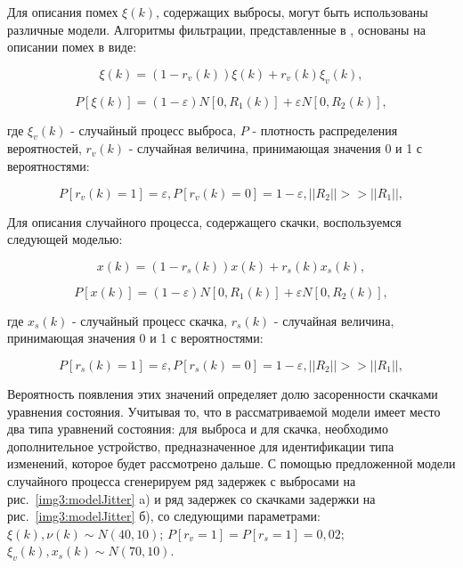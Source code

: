 Для описания помех $\xi(k)$, содержащих выбросы, могут быть использованы различные модели. Алгоритмы фильтрации, представленные в \cite{masreliez_ieee, masreliez_martin, ershov_lipcer, ershov}, основаны на описании помех в виде:


\begin{equation}\label{eq3:v}
\xi(k)=(1-r_v(k))\xi(k)+r_v(k)\xi_v(k),
\end{equation}

\begin{equation}\label{eq3:vp}
P[\xi(k)]=(1-\varepsilon)N[0,R_1(k)]+\varepsilon N[0,R_2(k)],
\end{equation}

\noindent где $\xi_v(k)$ - случайный процесс выброса, $P$ - плотность распределения вероятностей, $r_v(k)$ - случайная величина, принимающая значения 0 и 1 с вероятностями:

\begin{equation}\label{eq3:vpp}
P[r_v(k)=1]=\varepsilon, P[r_v(k)=0]=1-\varepsilon, ||R_2||>>||R_1||,
\end{equation}


Для описания случайного процесса, содержащего скачки, воспользуемся следующей моделью:

\begin{equation}\label{eq3:s}
x(k)=(1-r_s(k))x(k)+r_s(k)x_s(k),
\end{equation}

\begin{equation}\label{eq3:sp}
P[x(k)]=(1-\varepsilon)N[0,R_1(k)]+\varepsilon N[0,R_2(k)],
\end{equation}

\noindent где $x_s(k)$ - случайный процесс скачка, $r_s(k)$ - случайная величина, принимающая значения 0 и 1 с вероятностями:

\begin{equation}\label{eq3:spp}
P[r_s(k)=1]=\varepsilon, P[r_s(k)=0]=1-\varepsilon, ||R_2||>>||R_1||,
\end{equation}

Вероятность появления этих значений определяет долю засоренности скачками уравнения состояния. 
Учитывая то, что в рассматриваемой модели имеет место два типа уравнений состояния: для выброса и для скачка, необходимо дополнительное устройство, предназначенное для идентификации типа изменений, которое будет рассмотрено дальше.
С помощью предложенной модели случайного процесса сгенерируем ряд задержек с выбросами на рис. \ref{img3:modelJitter} a) и ряд задержек со скачками задержки на рис. \ref{img3:modelJitter} б),
со следующими параметрами: $\xi(k),\nu(k)\sim N(40,10)$; $P[r_v=1]=P[r_s=1]=0,02$; $\xi_v(k),x_s(k)\sim N(70,10)$.

